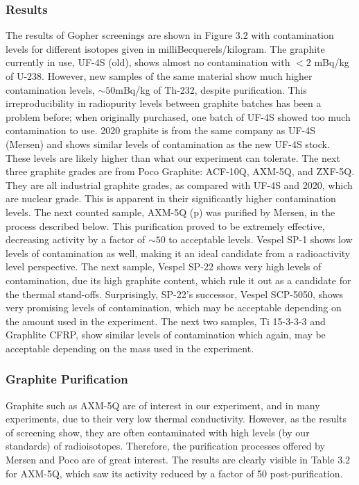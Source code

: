 \documentclass{report}
\begin{document}
\subsubsection{Results}

The results of Gopher screenings are shown in Figure 3.2 with contamination levels for different isotopes given in milliBecquerels/kilogram. The graphite currently in use, UF-4S (old), shows almost no contamination with $<2$ mBq/kg of U-238. However, new samples of the same material show much higher contamination levels, $\sim 50$mBq/kg of Th-232, despite purification. This irreproducibility in radiopurity levels between graphite batches has been a problem before; when originally purchased, one batch of UF-4S showed too much contamination to use. 2020 graphite is from the same company as UF-4S (Mersen) and shows similar levels of contamination as the new UF-4S stock. These levels are likely higher than what our experiment can tolerate. The next three graphite grades are from Poco Graphite: ACF-10Q, AXM-5Q, and ZXF-5Q. They are all industrial graphite grades, as compared with UF-4S and 2020, which are nuclear grade. This is apparent in their significantly higher contamination levels. The next counted sample, AXM-5Q (p) was purified by Mersen, in the process described below. This purification proved to be extremely effective, decreasing activity by a factor of $\sim50$ to acceptable levels. Vespel SP-1 shows low levels of contamination as well, making it an ideal candidate from a radioactivity level perspective. The next sample, Vespel SP-22 shows very high levels of contamination, due its high graphite content, which rule it out as a candidate for the thermal stand-offs. Surprisingly, SP-22's successor, Vespel SCP-5050, shows very promising levels of contamination, which may be acceptable depending on the amount used in the experiment. The next two samples, Ti 15-3-3-3 and Graphlite CFRP, show similar levels of contamination which again, may be acceptable depending on the mass used in the experiment.

\subsubsection{Graphite Purification}
Graphite such as AXM-5Q are of interest in our experiment, and in many experiments, due to their very low thermal conductivity. However, as the results of screening show, they are often contaminated with high levels (by our standards) of radioisotopes. Therefore, the purification processes offered by Mersen and Poco are of great interest. The results are clearly visible in Table 3.2 for AXM-5Q, which saw its activity reduced by a factor of 50 post-purification.
\end{document}
